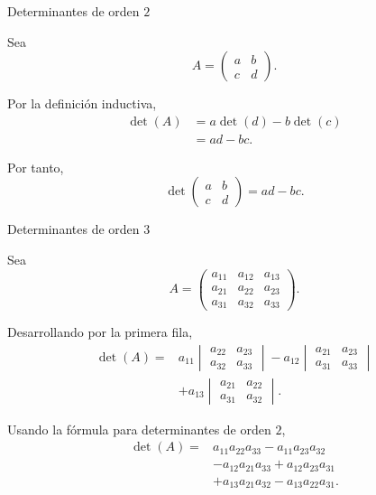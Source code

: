 \begin{frame}{Determinantes de orden \(2\)}

Sea
\[
A=
\begin{pmatrix}
a&b\\
c&d
\end{pmatrix}.
\]

Por la definición inductiva,
\[
\begin{aligned}
\det(A)
&=
a\det(d)-b\det(c)\\
&=ad-bc.
\end{aligned}
\]

Por tanto,
\[
\det
\begin{pmatrix}
a&b\\
c&d
\end{pmatrix}
=
ad-bc.
\]

\end{frame}

\begin{frame}[allowframebreaks]{Determinantes de orden \(3\)}

Sea
\[
A=
\begin{pmatrix}
a_{11}&a_{12}&a_{13}\\
a_{21}&a_{22}&a_{23}\\
a_{31}&a_{32}&a_{33}
\end{pmatrix}.
\]

Desarrollando por la primera fila,
\[
\begin{aligned}
\det(A)
={}&
a_{11}
\begin{vmatrix}
a_{22}&a_{23}\\
a_{32}&a_{33}
\end{vmatrix}
-
a_{12}
\begin{vmatrix}
a_{21}&a_{23}\\
a_{31}&a_{33}
\end{vmatrix}\\
&+
a_{13}
\begin{vmatrix}
a_{21}&a_{22}\\
a_{31}&a_{32}
\end{vmatrix}.
\end{aligned}
\]

Usando la fórmula para determinantes de orden \(2\),
\[
\begin{aligned}
\det(A)
={}&
a_{11}a_{22}a_{33}
-a_{11}a_{23}a_{32}\\
&-a_{12}a_{21}a_{33}
+a_{12}a_{23}a_{31}\\
&+a_{13}a_{21}a_{32}
-a_{13}a_{22}a_{31}.
\end{aligned}
\]
\end{frame}

